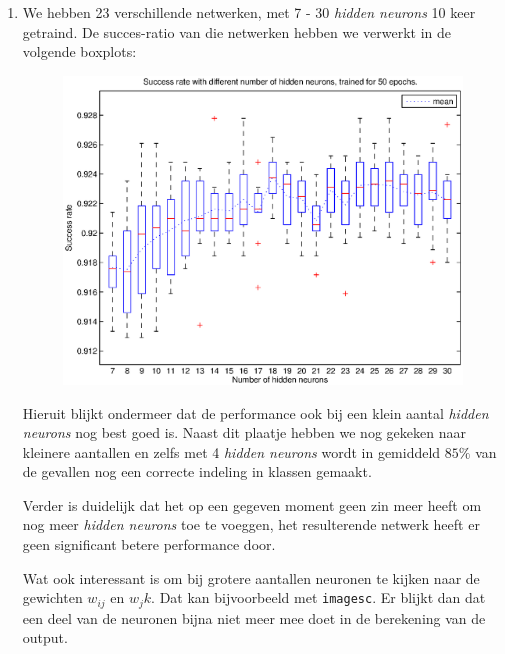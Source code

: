 \documentclass[a4paper,10pt,fleqn]{article}
\begin{document}
\begin{enumerate}[1.]
	\item We hebben 23 verschillende netwerken, met 7 - 30 \textit{hidden neurons} 10 keer getraind. De succes-ratio van die netwerken hebben we verwerkt in de volgende boxplots:
    \begin{figure}[!ht]
    	\centering
        \includegraphics[width=.9\textwidth]{images/error-boxplot}
    \end{figure}
    Hieruit blijkt ondermeer dat de performance ook bij een klein aantal \textit{hidden neurons} nog best goed is. Naast dit plaatje hebben we nog gekeken naar kleinere aantallen en zelfs met 4 \textit{hidden neurons} wordt in gemiddeld $85\%$ van de gevallen nog een correcte indeling in klassen gemaakt.

    Verder is duidelijk dat het op een gegeven moment geen zin meer heeft om nog meer \textit{hidden neurons} toe te voeggen, het resulterende netwerk heeft er geen significant betere performance door.

    Wat ook interessant is om bij grotere aantallen neuronen te kijken naar de gewichten $w_{ij}$ en $w_jk$. Dat kan bijvoorbeeld met \verb|imagesc|. Er blijkt dan dat een deel van de neuronen bijna niet meer mee doet in de berekening van de output.



\end{enumerate}
\end{document}
